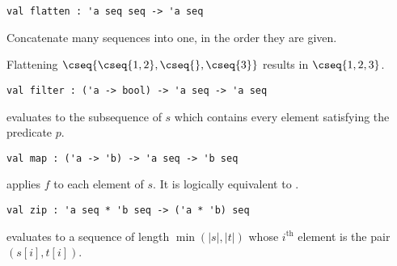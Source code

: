 \begin{flex}
\label{grp:grm:seq-interface::flatten}

\begin{gram}
\label{grm:seq-interface::flatten}
\begin{gram}[flatten]
\label{gr:flatten}
\begin{verbatim}
val flatten : 'a seq seq -> 'a seq
\end{verbatim}
Concatenate many sequences into one, in the order they are given.
\end{gram}
\begin{example}
Flattening $\cseq{\cseq{1,2},\cseq{},\cseq{3}}$ results in $\cseq{1,2,3}$.
\end{example}

\end{gram}
\end{flex}

\begin{cluster}
\label{grp:gr:filter}

\begin{gram}[filter]
\label{gr:filter}
\begin{verbatim}
val filter : ('a -> bool) -> 'a seq -> 'a seq
\end{verbatim}
 evaluates to the subsequence of $s$ which contains every
element satisfying the predicate $p$.

\end{gram}
\end{cluster}

\begin{cluster}
\label{grp:gr:map}

\begin{gram}[map]
\label{gr:map}
\begin{verbatim}
val map : ('a -> 'b) -> 'a seq -> 'b seq
\end{verbatim}
 applies $f$ to each element of $s$. It is logically equivalent
to .

\end{gram}
\end{cluster}

\begin{cluster}
\label{grp:gr:zip}

\begin{gram}[zip]
\label{gr:zip}
\begin{verbatim}
val zip : 'a seq * 'b seq -> ('a * 'b) seq
\end{verbatim}
 evaluates to a sequence of length $\min(|s|,|t|)$ whose $i^\text{th}$
element is the pair $(s[i], t[i])$.

\end{gram}
\end{cluster}

